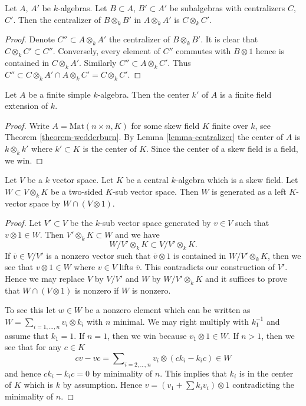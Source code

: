 \begin{lemma}
\label{lemma-centralizer}
Let $A$, $A'$ be $k$-algebras. Let $B \subset A$, $B' \subset A'$ be
subalgebras with centralizers $C$, $C'$. Then the centralizer of
$B \otimes_k B'$ in $A \otimes_k A'$ is $C \otimes_k C'$.
\end{lemma}

\begin{proof}
Denote $C'' \subset A \otimes_k A'$ the centralizer of $B \otimes_k B'$.
It is clear that $C \otimes_k C' \subset C''$. Conversely, every element
of $C''$ commutes with $B \otimes 1$ hence is contained in $C \otimes_k A'$.
Similarly $C'' \subset A \otimes_k C'$. Thus
$C'' \subset C \otimes_k A' \cap A \otimes_k C' = C \otimes_k C'$.
\end{proof}

\begin{lemma}
\label{lemma-center-csa}
Let $A$ be a finite simple $k$-algebra. Then the center $k'$ of $A$
is a finite field extension of $k$.
\end{lemma}

\begin{proof}
Write $A = \text{Mat}(n \times n, K)$ for some skew field $K$ finite
over $k$, see
Theorem \ref{theorem-wedderburn}.
By
Lemma \ref{lemma-centralizer}
the center of $A$ is $k \otimes_k k'$ where $k' \subset K$ is the
center of $K$. Since the center of a skew field is a field, we win.
\end{proof}

\begin{lemma}
\label{lemma-generate-two-sided-sub}
Let $V$ be a $k$ vector space. Let $K$ be a central $k$-algebra
which is a skew field. Let $W \subset V \otimes_k K$ be a two-sided
$K$-sub vector space. Then $W$ is generated as a left $K$-vector
space by $W \cap (V \otimes 1)$.
\end{lemma}

\begin{proof}
Let $V' \subset V$ be the $k$-sub vector space generated by $v \in V$
such that $v \otimes 1 \in W$. Then $V' \otimes_k K \subset W$ and
we have
$$
W/V' \otimes_k K  \subset  V/V' \otimes_k K.
$$
If $\overline{v} \in V/V'$ is a nonzero vector such that
$\overline{v} \otimes 1$ is contained in $W/V' \otimes_k K$,
then we see that $v \otimes 1 \in W$ where $v \in V$ lifts $\overline{v}$.
This contradicts our construction of $V'$. Hence we may replace
$V$ by $V/V'$ and $W$ by $W/V' \otimes_k K$ and it suffices to prove
that $W \cap (V \otimes 1)$ is nonzero if $W$ is nonzero.

\medskip\noindent
To see this let $w \in W$ be a nonzero element which can be written
as $W = \sum_{i = 1, \ldots, n} v_i \otimes k_i$ with $n$ minimal.
We may right multiply with $k_1^{-1}$ and assume that $k_1 = 1$.
If $n = 1$, then we win because $v_1 \otimes 1 \in W$.
If $n > 1$, then we see that for any $c \in K$
$$
c v - v c = \sum\nolimits_{i = 2, \ldots, n} v_i \otimes (c k_i - k_i c) \in W
$$
and hence $c k_i - k_i c = 0$ by minimality of $n$.
This implies that $k_i$ is in the center of $K$ which is $k$ by
assumption. Hence $v = (v_1 + \sum k_i v_i) \otimes 1$ contradicting
the minimality of $n$.
\end{proof}

